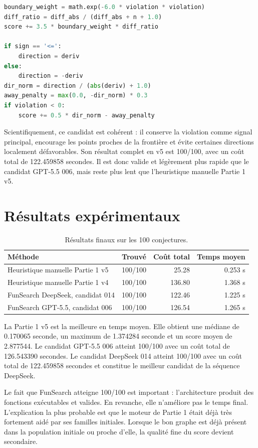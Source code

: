\documentclass[11pt,a4paper]{article}
\begin{document}
\begin{lstlisting}[language=Python,caption={Extrait de \texttt{candidate\_014.py}.}]
boundary_weight = math.exp(-6.0 * violation * violation)
diff_ratio = diff_abs / (diff_abs + n + 1.0)
score += 3.5 * boundary_weight * diff_ratio

if sign == '<=':
    direction = deriv
else:
    direction = -deriv
dir_norm = direction / (abs(deriv) + 1.0)
away_penalty = max(0.0, -dir_norm) * 0.3
if violation < 0:
    score += 0.5 * dir_norm - away_penalty
\end{lstlisting}

Scientifiquement, ce candidat est cohérent : il conserve la violation comme signal principal, encourage les points proches de la frontière et évite certaines directions localement défavorables. Son résultat complet en v5 est 100/100, avec un coût total de 122.459858 secondes. Il est donc valide et légèrement plus rapide que le candidat GPT-5.5 006, mais reste plus lent que l'heuristique manuelle Partie 1 v5.

\section{Résultats expérimentaux}

\begin{table}[H]
\centering
\begin{tabular}{lrrr}
\toprule
Méthode & Trouvé & Coût total & Temps moyen \\
\midrule
Heuristique manuelle Partie 1 v5 & 100/100 & 25.28 & 0.253 s \\
Heuristique manuelle Partie 1 v4 & 100/100 & 136.80 & 1.368 s \\
FunSearch DeepSeek, candidat 014 & 100/100 & 122.46 & 1.225 s \\
FunSearch GPT-5.5, candidat 006 & 100/100 & 126.54 & 1.265 s \\
\bottomrule
\end{tabular}
\caption{Résultats finaux sur les 100 conjectures.}
\end{table}

La Partie 1 v5 est la meilleure en temps moyen. Elle obtient une médiane de 0.170065 seconde, un maximum de 1.374284 seconde et un score moyen de 2.877544. Le candidat GPT-5.5 006 atteint 100/100 avec un coût total de 126.543390 secondes. Le candidat DeepSeek 014 atteint 100/100 avec un coût total de 122.459858 secondes et constitue le meilleur candidat de la séquence DeepSeek.

Le fait que FunSearch atteigne 100/100 est important : l'architecture produit des fonctions exécutables et valides. En revanche, elle n'améliore pas le temps final. L'explication la plus probable est que le moteur de Partie 1 était déjà très fortement aidé par ses familles initiales. Lorsque le bon graphe est déjà présent dans la population initiale ou proche d'elle, la qualité fine du score devient secondaire.
\end{document}
